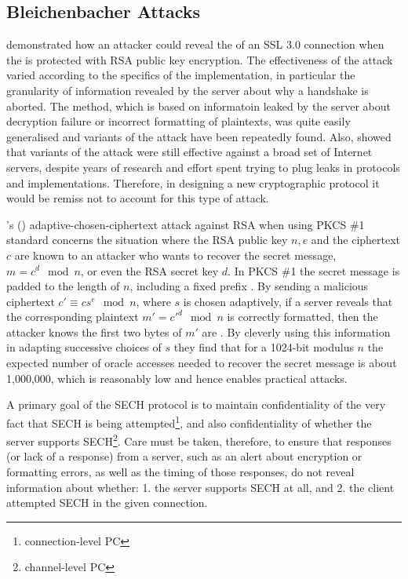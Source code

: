 \subsection{Bleichenbacher Attacks \label{bleichenbacher-attack}}
\cite{bleichenbacher1998chosen} demonstrated how an attacker could reveal the \premastersecret{} of an \ac{SSL} 3.0 connection when the \premastersecret{} is protected with \ac{RSA} public key encryption.
The effectiveness of the attack varied according to the specifics of the implementation, in particular the granularity of information revealed by the server about why a handshake is aborted.
The method, which is based on informatoin leaked by the server about decryption failure or incorrect formatting of plaintexts, was quite easily generalised and variants of the attack have been repeatedly found.
Also, \cite{boeck2018robot} showed that variants of the attack were still effective against a broad set of Internet servers, despite years of research and effort spent trying to plug leaks in protocols and implementations.
Therefore, in designing a new cryptographic protocol it would be remiss not to account for this type of attack.

\citeauthor{bleichenbacher1998chosen}'s (\citeyear{bleichenbacher1998chosen}) adaptive-chosen-ciphertext attack against \ac{RSA} when using  \ac{PKCS} \#1 standard concerns the situation where
the \ac{RSA} public key $n,e$ and the ciphertext $c$
are known to an attacker who wants to recover the secret message, $m=c^d\mod n$, or even
the \ac{RSA} secret key $d$.
In \ac{PKCS} \#1 the secret message is padded to the length of $n$, including a fixed prefix .
By sending a malicious ciphertext $c'\equiv cs^e\mod n$, where $s$ is chosen adaptively, if a server reveals that the corresponding plaintext $m'=c'^d\mod n$ is correctly formatted, then the attacker knows the first two bytes of $m'$ are .
By cleverly using this information in adapting successive choices of $s$ they find that for a 1024-bit modulus $n$ the expected number of oracle accesses needed to recover the secret message is about 1,000,000, which is reasonably low and hence enables practical attacks.

A primary goal of the \ac{SECH} protocol is to maintain confidentiality of the very fact that \ac{SECH} is being attempted\footnote{connection-level \ac{PC}},
and also confidentiality of whether the server supports \ac{SECH}\footnote{channel-level \ac{PC}}.
Care must be taken, therefore, to ensure that responses (or lack of a response)
from a server,
such as an alert about encryption or formatting errors,
as well as the timing of those responses,
do not reveal information about whether:
1. the server supports \ac{SECH} at all, and
2. the client attempted \ac{SECH} in the given connection.
